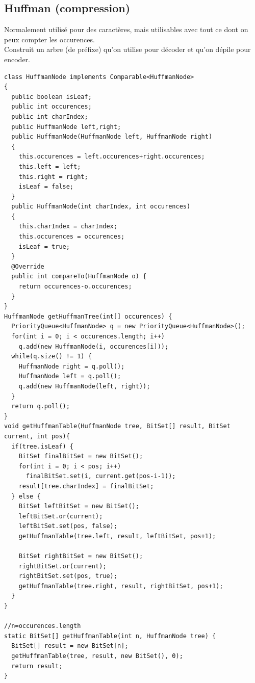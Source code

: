 \subsection{Huffman (compression)}
Normalement utilisé pour des caractères, mais utilisables avec tout ce dont on peux compter les occurences.\\
Construit un arbre (de préfixe) qu'on utilise pour décoder et qu'on dépile pour encoder.
\begin{lstlisting}
class HuffmanNode implements Comparable<HuffmanNode>
{
  public boolean isLeaf;
  public int occurences;
  public int charIndex;
  public HuffmanNode left,right;
  public HuffmanNode(HuffmanNode left, HuffmanNode right)
  {
    this.occurences = left.occurences+right.occurences;
    this.left = left;
    this.right = right;
    isLeaf = false;
  } 
  public HuffmanNode(int charIndex, int occurences)
  {
    this.charIndex = charIndex;
    this.occurences = occurences;
    isLeaf = true;
  }
  @Override
  public int compareTo(HuffmanNode o) {
    return occurences-o.occurences;
  }
}
HuffmanNode getHuffmanTree(int[] occurences) {
  PriorityQueue<HuffmanNode> q = new PriorityQueue<HuffmanNode>();
  for(int i = 0; i < occurences.length; i++)
    q.add(new HuffmanNode(i, occurences[i]));
  while(q.size() != 1) {
    HuffmanNode right = q.poll();
    HuffmanNode left = q.poll();
    q.add(new HuffmanNode(left, right));
  }
  return q.poll();
}
void getHuffmanTable(HuffmanNode tree, BitSet[] result, BitSet current, int pos){
  if(tree.isLeaf) {
    BitSet finalBitSet = new BitSet();
    for(int i = 0; i < pos; i++)
      finalBitSet.set(i, current.get(pos-i-1));
    result[tree.charIndex] = finalBitSet;
  } else {
    BitSet leftBitSet = new BitSet();
    leftBitSet.or(current);
    leftBitSet.set(pos, false);
    getHuffmanTable(tree.left, result, leftBitSet, pos+1);
            
    BitSet rightBitSet = new BitSet();
    rightBitSet.or(current);
    rightBitSet.set(pos, true);
    getHuffmanTable(tree.right, result, rightBitSet, pos+1);
  }
}
    
//n=occurences.length
static BitSet[] getHuffmanTable(int n, HuffmanNode tree) {
  BitSet[] result = new BitSet[n];
  getHuffmanTable(tree, result, new BitSet(), 0);
  return result;
}
\end{lstlisting}